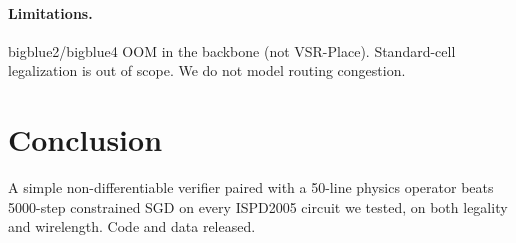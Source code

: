 \documentclass[10pt,twocolumn]{article}
\begin{document}
\paragraph{Limitations.} bigblue2/bigblue4 OOM in the backbone (not VSR-Place). Standard-cell legalization is out of scope. We do not model routing congestion.

\section{Conclusion}
A simple non-differentiable verifier paired with a 50-line physics operator beats 5000-step constrained SGD on every ISPD2005 circuit we tested, on both legality and wirelength. Code and data released.



\end{document}
